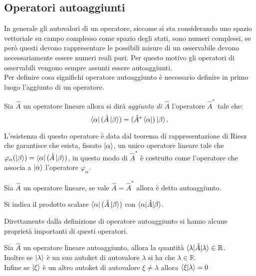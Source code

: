 \subsection{Operatori autoaggiunti}
In generale gli autovalori di un operatore, siccome si sta considerando uno spazio vettoriale su campo complesso come spazio degli stati, sono numeri complessi, se però questi devono rappresentare le possibili misure di un osservabile devono necessariamente essere numeri reali puri. Per questo motivo gli operatori di osservabili vengono sempre assunti essere autoaggiunti.\\
Per definire cosa significhi operatore autoaggiunto è necessario definire in primo luogo l'aggiunto di un operatore.
\begin{definition}
    Sia $\hat{A}$ un operatore lineare allora si dirà \emph{aggiunto di $\hat{A}$} l'operatore $\hat{A}^*$ tale che:
    \begin{equation}
        \bra{\alpha}(\hat A\ket\beta)=(\hat{A}^*\bra{\alpha})\ket\beta.
    \end{equation}
\end{definition}
L'esistenza di questo operatore è data dal teorema di rappresentazione di Riesz che garantisce che esista, fissato $\ket{\alpha}$, un unico operatore lineare tale che $\varphi_{\alpha}(\ket\beta)=\bra{\alpha}(\hat A\ket\beta)$, in questo modo di $\hat{A}^*$ è costruito come l'operatore che associa a $\ket{\alpha}$ l'operatore $\varphi_{\alpha}$.
\begin{definition}
    Sia $\hat{A}$ un operatore lineare, se vale $\hat A=\hat{A}^*$ allora è detto autoaggiunto.
\end{definition}
\begin{notation}
    Si indica il prodotto scalare $\bra{\alpha}(\hat A\ket\beta)$ con $\braket{\alpha|\hat A|\beta}$.
\end{notation}
Direttamente dalla definizione di operatore autoaggiunto si hanno alcune proprietà importanti di questi operatori. 
\begin{proposition}
    Sia $\hat A$ un operatore lineare autoaggiunto, allora la quantità $\braket{\lambda|\hat A|\lambda}\in\mathbb{R} $.\\
    Inoltre se $\ket{\lambda}$ è un suo autoket di autovalore $\lambda$ si ha che $\lambda\in\mathbb{R}$.\\Infine se $\ket{\xi}$ è un altro autoket di autovalore $\xi\neq\lambda$ allora $\braket{\xi|\lambda}=0$
\end{proposition}  
